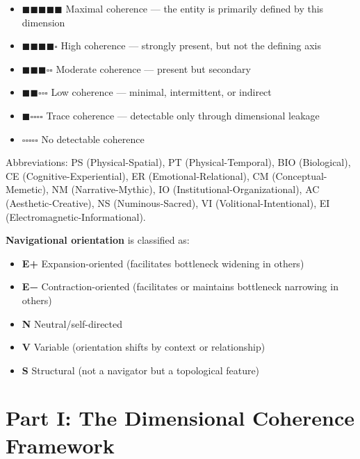 \begin{itemize}[nosep,leftmargin=*]
  \item \textbf{$\blacksquare$$\blacksquare$$\blacksquare$$\blacksquare$$\blacksquare$} Maximal coherence — the entity is primarily defined by this dimension
  \item \textbf{$\blacksquare$$\blacksquare$$\blacksquare$$\blacksquare$$\square$} High coherence — strongly present, but not the defining axis
  \item \textbf{$\blacksquare$$\blacksquare$$\blacksquare$$\square$$\square$} Moderate coherence — present but secondary
  \item \textbf{$\blacksquare$$\blacksquare$$\square$$\square$$\square$} Low coherence — minimal, intermittent, or indirect
  \item \textbf{$\blacksquare$$\square$$\square$$\square$$\square$} Trace coherence — detectable only through dimensional leakage
  \item \textbf{$\square$$\square$$\square$$\square$$\square$} No detectable coherence
\end{itemize}


Abbreviations: PS (Physical-Spatial), PT (Physical-Temporal), BIO (Biological), CE (Cognitive-Experiential), ER (Emotional-Relational), CM (Conceptual-Memetic), NM (Narrative-Mythic), IO (Institutional-Organizational), AC (Aesthetic-Creative), NS (Numinous-Sacred), VI (Volitional-Intentional), EI (Electromagnetic-Informational).


\textbf{Navigational orientation} is classified as:

\begin{itemize}[nosep,leftmargin=*]
  \item \textbf{E+} Expansion-oriented (facilitates bottleneck widening in others)
  \item \textbf{E−} Contraction-oriented (facilitates or maintains bottleneck narrowing in others)
  \item \textbf{N} Neutral/self-directed
  \item \textbf{V} Variable (orientation shifts by context or relationship)
  \item \textbf{S} Structural (not a navigator but a topological feature)
\end{itemize}


\bigskip\noindent\makebox[\textwidth]{\color{rulegray}\rule{5cm}{0.3pt}}\bigskip


\section*{Part I: The Dimensional Coherence Framework}


